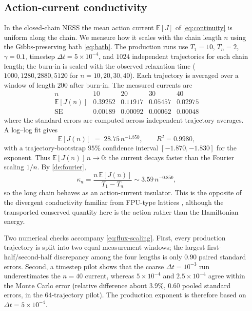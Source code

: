 \documentclass[11pt,a4paper]{article}
\theoremstyle{definition}
\newcommand{\E}{\mathbb{E}}
\numberwithin{equation}{section}   %
\begin{document}
\subsection{Action-current conductivity}\label{sec:thermal-conductivity}

In the closed-chain NESS the mean action current $\E[J]$ of
\eqref{eq:continuity} is uniform along the chain. We measure how it scales with
the chain length $n$ using the Gibbs-preserving bath \eqref{eq:bath}. The
production runs use $T_1=10$, $T_n=2$, $\gamma=0.1$, timestep
$\Delta t=5\times10^{-4}$, and $1024$ independent trajectories for each chain
length; the burn-in is scaled with the observed relaxation time
($1000,1280,2880,5120$ for $n=10,20,30,40$). Each trajectory is averaged over a
window of length $200$ after burn-in. The measured currents are
\[
\begin{array}{c|cccc}
n & 10 & 20 & 30 & 40\\ \hline
\E[J(n)] &
0.39252 & 0.11917 & 0.05457 & 0.02975\\
\mathrm{SE} &
0.00189 & 0.00092 & 0.00062 & 0.00048
\end{array}
\]
where the standard errors are computed across independent trajectory averages.
A log--log fit gives
\begin{equation}\label{eq:flux-scaling}
  \E[J(n)] \;=\; 28.75\,n^{-1.850},
  \qquad R^2=0.9980,
\end{equation}
with a trajectory-bootstrap $95\%$ confidence interval
$[-1.870,-1.830]$ for the exponent. Thus $\E[J(n)]\,n\to0$: the current decays
faster than the Fourier scaling $1/n$. By \cref{de:fourier},
\[
  \kappa_n=\frac{n\,\E[J(n)]}{T_1-T_n}
  \sim 3.59\,n^{-0.850},
\]
so the long chain behaves as an action-current insulator. This is the opposite
of the divergent conductivity familiar from FPU-type lattices
\cite{LepriLiviPoliti}, although the transported conserved quantity here is the
action rather than the Hamiltonian energy.

Two numerical checks accompany \eqref{eq:flux-scaling}. First, every production
trajectory is split into two equal measurement windows; the largest
first-half/second-half discrepancy among the four lengths is only $0.90$
paired standard errors. Second, a timestep pilot shows that the coarse
$\Delta t=10^{-3}$ run underestimates the $n=40$ current, whereas
$5\times10^{-4}$ and $2.5\times10^{-4}$ agree within the Monte Carlo error
(relative difference about $3.9\%$, $0.60$ pooled standard errors, in the
64-trajectory pilot). The production exponent is therefore based on
$\Delta t=5\times10^{-4}$.
\end{document}
